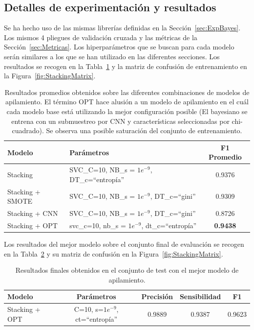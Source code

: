\documentclass[12pt,letterpaper]{article}
\begin{document}
\subsection{Detalles de experimentación y resultados} 
Se ha hecho uso de las mismas librerías definidas en la Sección~\ref{sec:ExpBayes}. Los mismos 4 pliegues de validación cruzada y las métricas de la Sección~\ref{sec:Metricas}.
Los hiperparámetros que se buscan para cada modelo serán similares a los que se han utilizado en las diferentes secciones. Los resultados se recogen en la Tabla~\ref{tab:StackingResults} y la matriz de confusión de entrenamiento en la Figura~\ref{fig:StackingMatrix}.

\begin{table}[!ht]
    \centering
    \begin{tabular}{llc}
        \hline
        \textbf{Modelo} & \textbf{Parámetros} &\textbf{F1 Promedio} \\\hline
        Stacking & SVC\_C=10, NB\_s = $1e^{-9}$, DT\_c=``entropía''& 0.9376\\ 
        Stacking + SMOTE & SVC\_C=10, NB\_s = $1e^{-9}$, DT\_c=``gini''& 0.9309 \\ 
        Stacking + CNN & SVC\_C=10, NB\_s = $1e^{-9}$, DT\_c=``gini'' & 0.8726 \\ 
        Stacking + OPT & svc\_c=10, nb\_s = $1e^{-9}$, dt\_c=``entropía''& \textbf{0.9438} \\ 
        \hline
    \end{tabular}
    \caption{Resultados promedios obtenidos sobre las diferentes combinaciones de modelos de apilamiento. El término OPT hace alusión a un modelo de apilamiento en el cuál cada modelo base está utilizando la mejor configuración posible (El bayesiano se entrena con un submuestreo por CNN y características seleccionadas por chi-cuadrado). Se observa una posible saturación del conjunto de entrenamiento.} 
    \label{tab:StackingResults}
\end{table}

Los resultados del mejor modelo sobre el conjunto final de evaluación se recogen en la Tabla~\ref{tab:StackingFinalResults} y su matriz de confusión en la Figura~\ref{fig:StackingMatrix}.

\begin{table}[!ht]
    \centering
    \begin{tabular}{lcccc}
        \hline
        \textbf{Modelo} & \textbf{Parámetros} &\textbf{Precisión} &\textbf{Sensibilidad} &\textbf{F1} \\\hline
        Stacking + OPT & C=10, s=$1e^{-9}$, ct=``entropía'' & 0.9889 & 0.9387 & 0.9623\\ 
        \hline
    \end{tabular}
    \caption{Resultados finales obtenidos en el conjunto de test con el mejor modelo de apilamiento.}
    \label{tab:StackingFinalResults}
\end{table}
\end{document}
